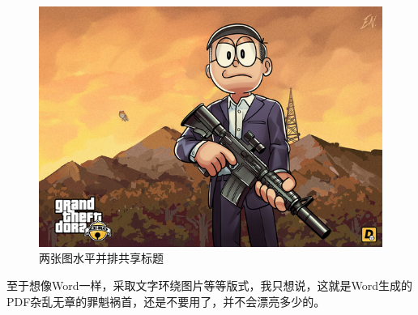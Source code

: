 \documentclass[12pt,a4paper,oneside]{book}
\begin{document}
{\begin{figure}[h]
\includegraphics[scale=0.21]{Figures/xf.png}
\caption{两张图水平并排共享标题}
\label{pic:dora}
\end{figure}
\par
至于想像Word一样，采取文字环绕图片等等版式，我只想说，这就是Word生成的PDF杂乱无章的罪魁祸首，还是不要用了，并不会漂亮多少的。

}
\end{document}
